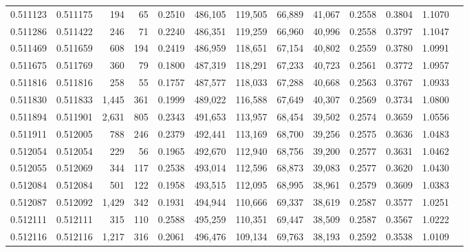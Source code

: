 \begin{tabular}{rrrrrrrrrrrrr}
0.511123 & 0.511175 &   194 &    65 &                                     0.2510 & 486,105 & 119,505 &  66,889 &  41,067 & 0.2558 & 0.3804 & 1.1070 \\
0.511286 & 0.511422 &   246 &    71 &                                     0.2240 & 486,351 & 119,259 &  66,960 &  40,996 & 0.2558 & 0.3797 & 1.1047 \\
0.511469 & 0.511659 &   608 &   194 &                                     0.2419 & 486,959 & 118,651 &  67,154 &  40,802 & 0.2559 & 0.3780 & 1.0991 \\
0.511675 & 0.511769 &   360 &    79 &                                     0.1800 & 487,319 & 118,291 &  67,233 &  40,723 & 0.2561 & 0.3772 & 1.0957 \\
0.511816 & 0.511816 &   258 &    55 &                                     0.1757 & 487,577 & 118,033 &  67,288 &  40,668 & 0.2563 & 0.3767 & 1.0933 \\
0.511830 & 0.511833 & 1,445 &   361 &                                     0.1999 & 489,022 & 116,588 &  67,649 &  40,307 & 0.2569 & 0.3734 & 1.0800 \\
0.511894 & 0.511901 & 2,631 &   805 &                                     0.2343 & 491,653 & 113,957 &  68,454 &  39,502 & 0.2574 & 0.3659 & 1.0556 \\
0.511911 & 0.512005 &   788 &   246 &                                     0.2379 & 492,441 & 113,169 &  68,700 &  39,256 & 0.2575 & 0.3636 & 1.0483 \\
0.512054 & 0.512054 &   229 &    56 &                                     0.1965 & 492,670 & 112,940 &  68,756 &  39,200 & 0.2577 & 0.3631 & 1.0462 \\
0.512055 & 0.512069 &   344 &   117 &                                     0.2538 & 493,014 & 112,596 &  68,873 &  39,083 & 0.2577 & 0.3620 & 1.0430 \\
0.512084 & 0.512084 &   501 &   122 &                                     0.1958 & 493,515 & 112,095 &  68,995 &  38,961 & 0.2579 & 0.3609 & 1.0383 \\
0.512087 & 0.512092 & 1,429 &   342 &                                     0.1931 & 494,944 & 110,666 &  69,337 &  38,619 & 0.2587 & 0.3577 & 1.0251 \\
0.512111 & 0.512111 &   315 &   110 &                                     0.2588 & 495,259 & 110,351 &  69,447 &  38,509 & 0.2587 & 0.3567 & 1.0222 \\
0.512116 & 0.512116 & 1,217 &   316 &                                     0.2061 & 496,476 & 109,134 &  69,763 &  38,193 & 0.2592 & 0.3538 & 1.0109 \\

\end{tabular}
